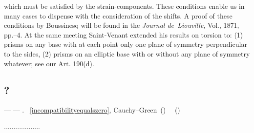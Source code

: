 \begin{tcolorbox}[breakable, enhanced, colback = green!11, before upper={\parindent3.2ex}, parbox = false]
\noindent
which must be satisfied by the strain-components. These conditions enable us in many cases to dispense with the consideration of the shifts. A proof of these conditions by Boussinesq will be found in the \emph{Journal de~Liouville}, Vol., 1871, pp.\hbox{--}4. At the same meeting Saint-Venant extended his results on torsion to\:: (1) prisms on any base with at each point only one plane of symmetry perpendicular to the sides, (2) prisms on an elliptic base with or without any plane of symmetry whatever\:; see our Art. 190\:(d).
\par
\end{tcolorbox}


\subsection*{?}

\:--- \:---
.
~\eqref{incompatibilityequalszero}, 
Cauchy\hbox{--}Green~()
~~()

...................
